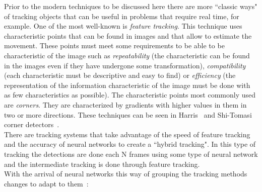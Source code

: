 Prior to the modern techniques to be discussed here there are more ``classic ways" of tracking objects that can be useful in problems that require real time, for example. One of the most well-known is \textit{feature tracking}. This technique uses characteristic points that can be found in images and that allow to estimate the movement. These points must meet some requirements to be able to be characteristic of the image such as \textit{repeatability} (the characteristic can be found in the images even if they have undergone some transformation), \textit{compatibility} (each characteristic must be descriptive and easy to find) or \textit{efficiency} (the representation of the information characteristic of the image must be done with as few characteristics as possible). The characteristic points most commonly used are \textit{corners}. They are characterized by gradients with higher values in them in two or more directions. These techniques can be seen in Harris~\cite{harris1988combined} and Shi-Tomasi corner detectors~\cite{shi1994good}.\\
There are tracking systems that take advantage of the speed of feature tracking and the accuracy of neural networks to create a ``hybrid tracking". In this type of tracking the detections are done each N frames using some type of neural network and the intermediate tracking is done through feature tracking.\\
With the arrival of neural networks this way of grouping the tracking methods changes to adapt to them~\cite{held2016learning}:
